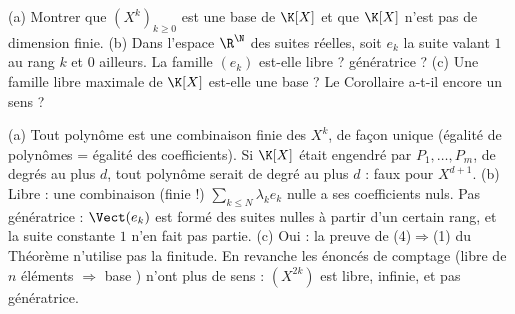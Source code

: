 \begin{exo}
(a) Montrer que $(X^k)_{k\ge0}$ est une base de $\K[X]$ et que $\K[X]$ n'est pas de dimension finie. (b) Dans l'espace $\R^{\N}$ des suites réelles, soit $e_k$ la suite valant $1$ au rang $k$ et $0$ ailleurs. La famille $(e_k)$ est-elle libre ? génératrice ? (c) Une famille libre maximale de $\K[X]$ est-elle une base ? Le Corollaire  a-t-il encore un sens ?
\begin{corrige}
(a) Tout polynôme est une combinaison finie des $X^k$, de façon unique (égalité de polynômes = égalité des coefficients). Si $\K[X]$ était engendré par $P_1,\dots,P_m$, de degrés au plus $d$, tout polynôme serait de degré au plus $d$ : faux pour $X^{d+1}$.
(b) Libre : une combinaison (finie !) $\sum_{k\le N}\lambda_ke_k$ nulle a ses coefficients nuls. Pas génératrice : $\Vect(e_k)$ est formé des suites nulles à partir d'un certain rang, et la suite constante $1$ n'en fait pas partie.
(c) Oui : la preuve de (4)$\Rightarrow$(1) du Théorème  n'utilise pas la finitude. En revanche les énoncés de comptage (\og libre de $n$ éléments $\Rightarrow$ base \fg) n'ont plus de sens : $(X^{2k})$ est libre, infinie, et pas génératrice.
\end{corrige}
\end{exo}


